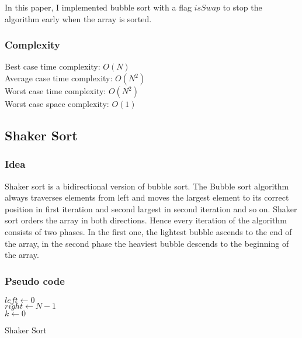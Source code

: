 \documentclass[11pt,a4paper]{article}
\newcommand\tab[1][1cm]{\hspace*{#1}}
\begin{document}
In this paper, I implemented bubble sort with a flag $isSwap$ to stop the algorithm early
when the array is sorted.

\subsubsection*{Complexity}
Best case time complexity: $O(N)$ \\
Average case time complexity: $O(N^2)$\\
Worst case time complexity: $O(N^2)$ \\
Worst case space complexity: $O(1)$

\subsection{Shaker Sort}
\subsubsection*{Idea}
\tab Shaker sort is a bidirectional version of bubble sort.
The Bubble sort algorithm always traverses elements from left and moves the largest 
element to its correct position in first iteration and second largest in second iteration and so on.
Shaker sort orders the array in both directions. Hence every iteration of the algorithm consists of two phases. 
In the first one, the lightest bubble ascends to the end of the array, in the second phase the heaviest bubble descends to the beginning of the array.

\subsubsection*{Pseudo code}
\begin{algorithm2e}
  \SetAlgoLined
  $left \gets 0$ \\
  $right \gets N-1$ \\
  $k \gets 0$\\
  \caption{Shaker Sort}
\end{algorithm2e}
\end{document}
